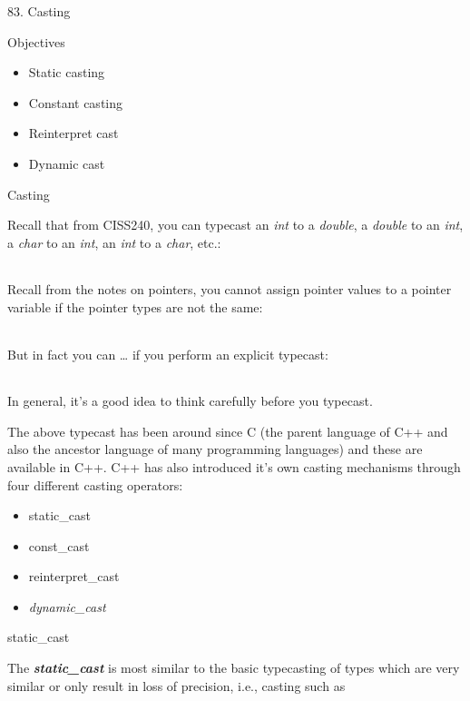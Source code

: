 \documentclass[
]{article}
\author{}
\date{}
\providecommand{\tightlist}{%
  \setlength{\itemsep}{0pt}\setlength{\parskip}{0pt}}
\begin{document}
83. Casting

Objectives

\begin{itemize}
\tightlist
\item
  Static casting
\item
  Constant casting
\item
  Reinterpret cast
\item
  Dynamic cast
\end{itemize}

Casting

Recall that from CISS240, you can typecast an \emph{int} to a
\emph{double}, a \emph{double} to an \emph{int}, a \emph{char} to an
\emph{int}, an \emph{int} to a \emph{char}, etc.:

\begin{longtable}[]{@{}@{}}
\toprule
\endhead
\bottomrule
\end{longtable}

Recall from the notes on pointers, you cannot assign pointer values to a
pointer variable if the pointer types are not the same:

\begin{longtable}[]{@{}@{}}
\toprule
\endhead
\bottomrule
\end{longtable}

But in fact you can \ldots{} if you perform an explicit typecast:

\begin{longtable}[]{@{}@{}}
\toprule
\endhead
\bottomrule
\end{longtable}

In general, it's a good idea to think carefully before you typecast.

The above typecast has been around since C (the parent language of C++
and also the ancestor language of many programming languages) and these
are available in C++. C++ has also introduced it's own casting
mechanisms through four different casting operators:

\begin{itemize}
\tightlist
\item
  static\_cast
\item
  const\_cast
\item
  reinterpret\_cast
\item
  \emph{dynamic\_cast}
\end{itemize}

static\_cast

The \emph{\textbf{static\_cast}} is most similar to the basic
typecasting of types which are very similar or only result in loss of
precision, i.e., casting such as
\end{document}
